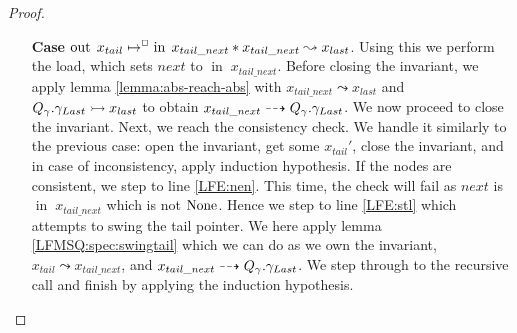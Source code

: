 \documentclass[a4paper, 11pt]{report}
\newcommand{\nIn}[1]{\operatorname{in} \; #1}
\newcommand{\nOut}[1]{\operatorname{out} \; #1}
\newcommand{\Qg}{Q_\gname}
\newcommand{\reach}[2]{#1 \leadsto #2}
\newcommand{\ar}[2]{#1 \dashrightarrow #2}
\newcommand{\ap}[2]{#1 \rightarrowtail #2}
\begin{document}
\begin{proof}
\begin{itemize}
    \item[\textbf{Case}]
    $\nOut{x_{tail} \mapsto^{\persistently} \nIn{x_{tail\_next}}} \star \reach{x_{tail\_next}}{x_{last}}$. Using this we perform the load, which sets $next$ to $\nIn{x_{tail\_next}}$. Before closing the invariant, we apply lemma \ref{lemma:abs-reach-abs} with $\reach{x_{tail\_next}}{x_{last}}$ and $\ap{\Qg.\gname_{Last}}{x_{last}}$ to obtain $\ar{x_{tail\_next}}{\Qg.\gname_{Last}}$. We now proceed to close the invariant. Next, we reach the consistency check. We handle it similarly to the previous case: open the invariant, get some $x_{tail}'$, close the invariant, and in case of inconsistency, apply induction hypothesis. If the nodes are consistent, we step to line \ref{LFE:nen}. This time, the check will fail as $next$ is $\nIn{x_{tail\_next}}$ which is not $\operatorname{None}$. Hence we step to line \ref{LFE:stl} which attempts to swing the tail pointer. We here apply lemma \ref{LFMSQ:spec:swingtail} which we can do as we own the invariant, $\reach{x_{tail}}{x_{tail\_next}}$, and $\ar{x_{tail\_next}}{\Qg.\gname_{Last}}$. We step through to the recursive call and finish by applying the induction hypothesis.
  \end{itemize}
\end{proof}
\end{document}
